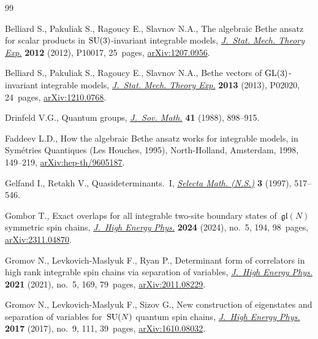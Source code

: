 \documentclass[10pt,a4paper]{amsart}
\theoremstyle{definition}
\begin{document}
\begin{thebibliography}{99}
\footnotesize\itemsep=0pt

Belliard S., Pakuliak S., Ragoucy E., Slavnov N.A., The algebraic {B}ethe
 ansatz for scalar products in {${\rm SU}(3)$}-invariant integrable models,
 \href{https://doi.org/10.1088/1742-5468/2012/10/p10017}{\textit{J.~Stat.
 Mech. Theory Exp.}} \textbf{2012} (2012), P10017, 25~pages,
 \href{http://arxiv.org/abs/1207.0956}{arXiv:1207.0956}.

Belliard S., Pakuliak S., Ragoucy E., Slavnov N.A., Bethe vectors of {${\rm
 GL}(3)$}-invariant integrable models,
 \href{https://doi.org/10.1088/1742-5468/2013/02/p02020}{\textit{J.~Stat.
 Mech. Theory Exp.}} \textbf{2013} (2013), P02020, 24~pages,
 \href{http://arxiv.org/abs/1210.0768}{arXiv:1210.0768}.

Drinfeld V.G., Quantum groups,
 \href{https://doi.org/10.1007/BF01247086}{\textit{J.~Sov. Math.}} \textbf{41}
 (1988), 898--915.

Faddeev L.D., How the algebraic {B}ethe ansatz works for integrable models, in
 Sym\'{e}tries {Q}uantiques ({L}es {H}ouches, 1995), North-Holland, Amsterdam,
 1998, 149--219,
 \href{http://arxiv.org/abs/hep-th/9605187}{arXiv:hep-th/9605187}.

Gelfand I., Retakh V., Quasideterminants.~{I},
 \href{https://doi.org/10.1007/s000290050019}{\textit{Selecta Math. (N.S.)}}
 \textbf{3} (1997), 517--546.

Gombor T., Exact overlaps for all integrable two-site boundary states
 of~{$\mathfrak{gl}(N)$} symmetric spin chains,
 \href{https://doi.org/10.1007/jhep05(2024)194}{\textit{J.~High Energy Phys.}}
 \textbf{2024} (2024), no.~5, 194, 98~pages,
 \href{http://arxiv.org/abs/2311.04870}{arXiv:2311.04870}.

Gromov N., Levkovich-Maslyuk F., Ryan P., Determinant form of correlators in
 high rank integrable spin chains via separation of variables,
 \href{https://doi.org/10.1007/jhep05(2021)169}{\textit{J.~High Energy Phys.}}
 \textbf{2021} (2021), no.~5, 169, 79~pages,
 \href{http://arxiv.org/abs/2011.08229}{arXiv:2011.08229}.

Gromov N., Levkovich-Maslyuk F., Sizov G., New construction of eigenstates and
 separation of variables for~{${\rm SU}(N)$} quantum spin chains,
 \href{https://doi.org/10.1007/jhep09(2017)111}{\textit{J.~High Energy Phys.}}
 \textbf{2017} (2017), no.~9, 111, 39~pages,
 \href{http://arxiv.org/abs/1610.08032}{arXiv:1610.08032}.


\end{thebibliography}
\end{document}
